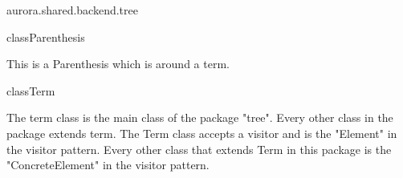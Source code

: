 \begin{texdocpackage}{aurora.shared.backend.tree}
\begin{texdocclass}{class}{Parenthesis}
\label{texdoclet:aurora.shared.backend.tree.Parenthesis}
\begin{texdocclassintro}
This is a Parenthesis which is around a term.\end{texdocclassintro}
\begin{texdocclassconstructors}
\end{texdocclassconstructors}
\begin{texdocclassmethods}
\end{texdocclassmethods}
\end{texdocclass}


\begin{texdocclass}{class}{Term}
\label{texdoclet:aurora.shared.backend.tree.Term}
\begin{texdocclassintro}
The term class is the main class of the package "tree". Every other class in the package extends term.
 The Term class accepts a visitor and is the "Element" in the visitor pattern.
 Every other class that extends Term in this package is the "ConcreteElement" in the visitor pattern.\end{texdocclassintro}
\begin{texdocclassconstructors}
\end{texdocclassconstructors}
\begin{texdocclassmethods}
\end{texdocclassmethods}
\end{texdocclass}


\end{texdocpackage}



